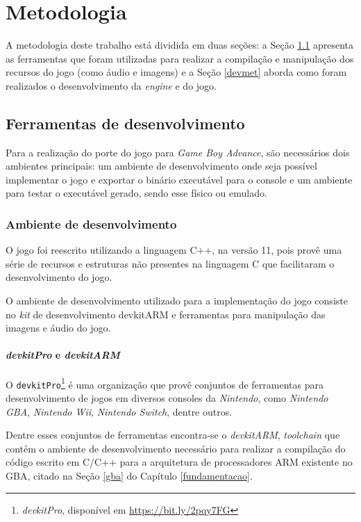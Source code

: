 \chapter[Metodologia]{Metodologia} \label{metodologia}

A metodologia deste trabalho está dividida em duas seções: a Seção \ref{devtools} apresenta as ferramentas que foram utilizadas para realizar a compilação e manipulação dos recursos do jogo (como áudio e imagens) e a Seção \ref{devmet} aborda como foram realizados o desenvolvimento da \textit{engine} e do jogo.

\section{Ferramentas de desenvolvimento} \label{devtools}

  Para a realização do porte do jogo para \textit{Game Boy Advance}, são necessários dois ambientes principais: um ambiente de desenvolvimento onde seja possível implementar o jogo e exportar o binário executável para o console e um ambiente para testar o executável gerado, sendo esse físico ou emulado.

  \subsection{Ambiente de desenvolvimento}

    O jogo foi reescrito utilizando a linguagem C++, na versão 11, pois provê uma série de recursos e estruturas não presentes na linguagem C que facilitaram o desenvolvimento do jogo.

    O ambiente de desenvolvimento utilizado para a implementação do jogo consiste no \textit{kit} de desenvolvimento devkitARM e ferramentas para manipulação das imagens e áudio do jogo.

    \subsubsection{\textit{devkitPro} e \textit{devkitARM}}

      O \texttt{devkitPro}\footnote{\textit{devkitPro}, disponível em \url{https://bit.ly/2pqy7FG}} é uma organização que provê conjuntos de ferramentas para desenvolvimento de jogos em diversos consoles da \textit{Nintendo}, como \textit{Nintendo GBA}, \textit{Nintendo Wii}, \textit{Nintendo Switch}, dentre outros.

      Dentre esses conjuntos de ferramentas encontra-se o \textit{devkitARM}, \textit{toolchain} que contém o ambiente de desenvolvimento necessário para realizar a compilação do código escrito em C/C++ para a arquitetura de processadores ARM existente no GBA, citado na Seção \ref{gba} do Capítulo \ref{fundamentacao}.

